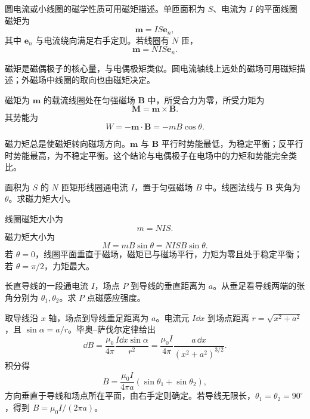 \begin{definition}[磁矩]\label{def:magnetic-moment}
圆电流或小线圈的磁学性质可用磁矩描述。单匝面积为 $S$、电流为 $I$ 的平面线圈磁矩为
\[
  \bm m=IS\bm e_n,
\]
其中 $\bm e_n$ 与电流绕向满足右手定则。若线圈有 $N$ 匝，
\[
  \bm m=NIS\bm e_n.
\]
\end{definition}

磁矩是磁偶极子的核心量，与电偶极矩类似。圆电流轴线上远处的磁场可用磁矩描述；外磁场中线圈的取向也由磁矩决定。

\begin{theorem}[载流线圈在匀强磁场中的力矩]\label{thm:loop-torque}
磁矩为 $\bm m$ 的载流线圈处在匀强磁场 $\bm B$ 中，所受合力为零，所受力矩为
\[
  \bm M=\bm m\times\bm B.
\]
其势能为
\[
  W=-\bm m\cdot\bm B=-mB\cos\theta.
\]
\end{theorem}

磁力矩总是使磁矩转向磁场方向。$\bm m$ 与 $\bm B$ 平行时势能最低，为稳定平衡；反平行时势能最高，为不稳定平衡。这个结论与电偶极子在电场中的力矩和势能完全类比。

\begin{example}[title={矩形载流线圈的磁力矩}]\label{eg:rect-loop-torque}
面积为 $S$ 的 $N$ 匝矩形线圈通电流 $I$，置于匀强磁场 $B$ 中。线圈法线与 $\bm B$ 夹角为 $\theta$。求磁力矩大小。
\begin{solution}
线圈磁矩大小为
\[
  m=NIS.
\]
磁力矩大小为
\[
  M=mB\sin\theta=NISB\sin\theta.
\]
若 $\theta=0$，线圈平面垂直于磁场，磁矩已与磁场平行，力矩为零且处于稳定平衡；若 $\theta=\pi/2$，力矩最大。
\end{solution}
\end{example}

\begin{example}[title={有限长直载流导线的磁场}]\label{eg:finite-wire-B}
长直导线的一段通电流 $I$，场点 $P$ 到导线的垂直距离为 $a$。从垂足看导线两端的张角分别为 $\theta_1,\theta_2$。求 $P$ 点磁感应强度。
\begin{solution}
取导线沿 $x$ 轴，场点到导线垂足距离为 $a$。电流元 $I\dd x$ 到场点距离 $r=\sqrt{x^2+a^2}$，且 $\sin\alpha=a/r$。毕奥--萨伐尔定律给出
\[
  \dd B=\frac{\mu_0}{4\pi}\frac{I\dd x\sin\alpha}{r^2}
  =\frac{\mu_0 I}{4\pi}\frac{a\,\dd x}{(x^2+a^2)^{3/2}}.
\]
积分得
\[
  B=\frac{\mu_0 I}{4\pi a}(\sin\theta_1+\sin\theta_2),
\]
方向垂直于导线和场点所在平面，由右手定则确定。若导线无限长，$\theta_1=\theta_2=90^\circ$，得到 $B=\mu_0 I/(2\pi a)$。
\end{solution}
\end{example}

